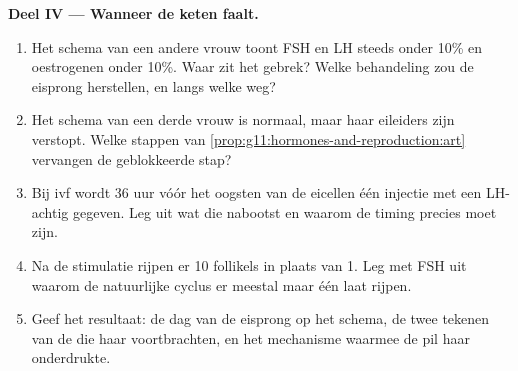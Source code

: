 \begin{problem}
\medskip
\noindent\textbf{Deel IV --- Wanneer de keten faalt.}
\begin{enumerate}[resume]
  \item Het schema van een andere vrouw toont FSH en LH steeds onder 10\%
        en oestrogenen onder 10\%. Waar zit het gebrek? Welke behandeling
        zou de eisprong herstellen, en langs welke weg?
  \item Het schema van een derde vrouw is normaal, maar haar eileiders
        zijn verstopt. Welke stappen van
        \cref{prop:g11:hormones-and-reproduction:art} vervangen de
        geblokkeerde stap?
  \item Bij ivf wordt 36 uur vóór het oogsten van de eicellen één injectie
        met een LH-achtig  gegeven. Leg uit wat die nabootst en
        waarom de timing precies moet zijn.
  \item Na de stimulatie rijpen er 10 follikels in plaats van 1. Leg met
        FSH uit waarom de natuurlijke cyclus er meestal maar één laat
        rijpen.
  \item Geef het resultaat: de dag van de eisprong op het schema, de twee
        tekenen van de  die haar voortbrachten, en het
        mechanisme waarmee de pil haar onderdrukte.
\end{enumerate}
\end{problem}
